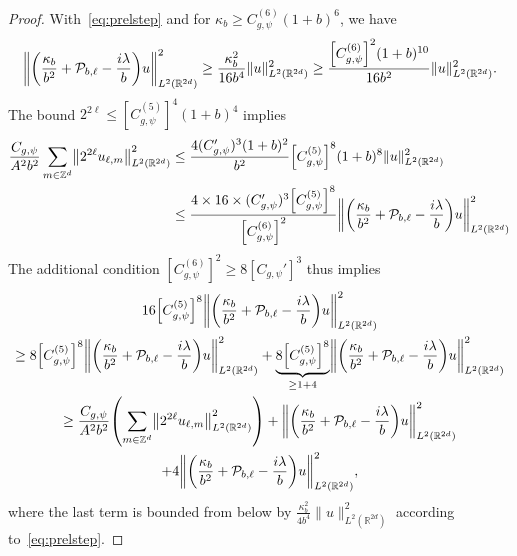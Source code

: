 \documentclass[10pt]{amsart}
\theoremstyle{definition}\newtheorem{defi}[theo]{Definition}\newtheorem{rema}[theo]{Remark}\newtheorem{exam}[theo]{Example}\newtheorem{exem}[theo]{Example}\newtheorem{nota}[theo]{Notation}
\newcommand{\Z}{\mathbb{Z}}
\newcommand{\R}{\mathbb{R}}
\newcommand{\clP}{\mathcal{P}}
\let\originalleft\left
\let\originalright\right
\renewcommand{\left}{\mathopen{}\mathclose\bgroup\originalleft}
\renewcommand{\right}{\aftergroup\egroup\originalright}
\newcounter{setofstep}
\newcounter{step}[setofstep]
\begin{document}
\begin{proof}
With~\eqref{eq:prelstep} and for $\kappa_{b}\geq C_{g,\psi}^{(6)}(1+b)^{6}$, we have
\[
\left\|\left(\frac{\kappa_{b}}{b^{2}}+\clP_{b,\ell}-\frac{i\lambda}{b}\right)u\right\|_{L^{2}(\R^{2d})}^{2}\geq \frac{\kappa_{b}^{2}}{16 b^{4}}\|u\|_{L^{2}(\R^{2d})}^{2}\geq \frac{\left[C_{g,\psi}^{(6)}\right]^{2}(1+b)^{10}}{16b^{2}}\|u\|_{L^{2}(\R^{2d})}^{2}.
\]
The bound $2^{2\ell}\leq [C_{g,\psi}^{(5)}]^{4}(1+b)^{4}$ implies
\begin{align*}
\frac{C_{g,\psi}}{A^{2}b^{2}}\sum_{m\in\Z^{d}}\left\|2^{2\ell}u_{\ell,m}\right\|^{2}_{L^{2}(\R^{2d})}&\leq \frac{4(C_{g,\psi}')^{3}(1+b)^{2}}{b^{2}}\left[C_{g,\psi}^{(5)}\right]^{8}(1+b)^{8}\|u\|^{2}_{L^{2}(\R^{2d})}\,\\
&\leq \frac{4\times 16 \times(C'_{g,\psi})^{3}\left[C_{g,\psi}^{(5)}\right]^{8}}{\left[C_{g,\psi}^{(6)}\right]^{2}}\left\|\left(\frac{\kappa_{b}}{b^{2}}+\clP_{b,\ell}-\frac{i\lambda}{b}\right)u\right\|_{L^{2}(\R^{2d})}^{2}
\end{align*}
The additional condition $[C_{g,\psi}^{(6)}]^{2}\geq 8[C_{g,\psi}']^{3}$ thus implies
\begin{multline*}
16 \left[C_{g,\psi}^{(5)}\right]^{8} \left\| \left(\frac{\kappa_{b}}{b^{2}}+\clP_{b,\ell} - \frac{i\lambda}{b}\right) u \right\|^{2}_{L^2(\R^{2d})}
\\
\geq 8 \left[C_{g,\psi}^{(5)}\right]^{8} \left\| \left(\frac{\kappa_{b}}{b^{2}}+\clP_{b,\ell} - \frac{i\lambda}{b}\right) u \right\|^{2}_{L^2(\R^{2d})} +\underbrace{8\left[C_{g,\psi}^{(5)}\right]^{8}}_{\geq 1+4} \left\|\left(\frac{\kappa_{b}}{b^{2}}+\clP_{b,\ell} - \frac{i\lambda}{b}\right) u \right\|^{2}_{L^2(\R^{2d})}
\\
\geq \frac{C_{g,\psi}}{A^{2}b^{2}}\left(\sum_{m\in\Z^{d}}\left\|2^{2\ell}u_{\ell,m}\right\|^{2}_{L^{2}(\R^{2d})}\right) +\left\| \left(\frac{\kappa_{b}}{b^{2}}+\clP_{b,\ell} - \frac{i\lambda}{b}\right) u \right\|^{2}_{L^2(\R^{2d})}
\\+4\left\|\left(\frac{\kappa_{b}}{b^{2}}+\clP_{b,\ell} - \frac{i\lambda}{b}\right) u\right\|^{2}_{L^2(\R^{2d})},
\end{multline*}
where the last term is bounded from below by $ \frac{\kappa_{b}^{2}}{4b^{4}}\|u\|^{2}_{L^{2}(\R^{2d})}$ according to~\eqref{eq:prelstep}.


\end{proof}
\end{document}
